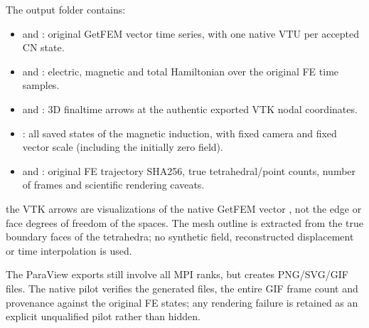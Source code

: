 \documentclass[letterpaper,10pt,english]{sphinxmanual}
\begin{document}
\sphinxAtStartPar
The output folder contains:
\begin{itemize}
\item {} 
\sphinxAtStartPar
{} and :
original GetFEM vector time series, with
one native VTU per accepted CN state.

\item {} 
\sphinxAtStartPar
{}
and : electric, magnetic and
total Hamiltonian over the original
FE time samples.

\item {} 
\sphinxAtStartPar
{}
and :
3D final\sphinxhyphen{}time arrows at the authentic
exported VTK nodal coordinates.

\item {} 
\sphinxAtStartPar
{}:
all saved states of the  magnetic
induction, with fixed camera and
fixed vector scale (including the
initially zero field).

\item {} 
\sphinxAtStartPar
{} and :
original FE trajectory SHA256,
true tetrahedral/point counts,
number of frames and scientific
rendering caveats.

\end{itemize}

\sphinxAtStartPar
{}
the VTK arrows are visualizations of
the native GetFEM vector , not the edge or face degrees
of freedom of the  spaces.
The mesh outline is extracted from the
true boundary faces of the tetrahedra;
no synthetic field, reconstructed
displacement or time interpolation is used.

\sphinxAtStartPar
The ParaView exports still involve all
MPI ranks, but  creates
PNG/SVG/GIF files. The native pilot
verifies the generated files, the entire
GIF frame count and provenance against
the original FE states; any rendering
failure is retained as an explicit
unqualified pilot rather than hidden.
\end{document}
